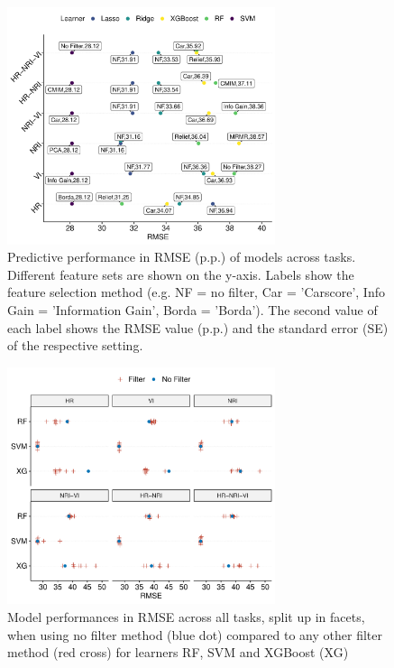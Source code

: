 \documentclass[remotesensing,article,submit,moreauthors,pdftex]{Definitions/mdpi}
\begin{document}
\begin{figure} [t!]
	\centering
	\begin{center}
		\includegraphics[width=0.7\textwidth] {performance-results-1.pdf}
		\caption{Predictive performance in RMSE (p.p.) of models across tasks. Different feature sets are shown on the y-axis. Labels show the feature selection method (e.g. NF = no filter, Car = 'Carscore', Info Gain = 'Information Gain', Borda = 'Borda'). The second value of each label shows the RMSE value (p.p.) and the standard error (SE) of the respective setting.}\label{fig:perf-result}
	\end{center}
\end{figure}

\begin{figure} [t!]
	\centering
	\begin{center}
		\includegraphics[width=0.7\textwidth] {filter-effect-all-vs-no-filter-1.pdf}
		\caption{Model performances in RMSE across all tasks, split up in facets, when using no filter method (blue dot) compared to any other filter method (red cross) for learners RF, SVM and XGBoost (XG)}\label{fig:filter-effects-no-filter}
	\end{center}
\end{figure}
\end{document}
